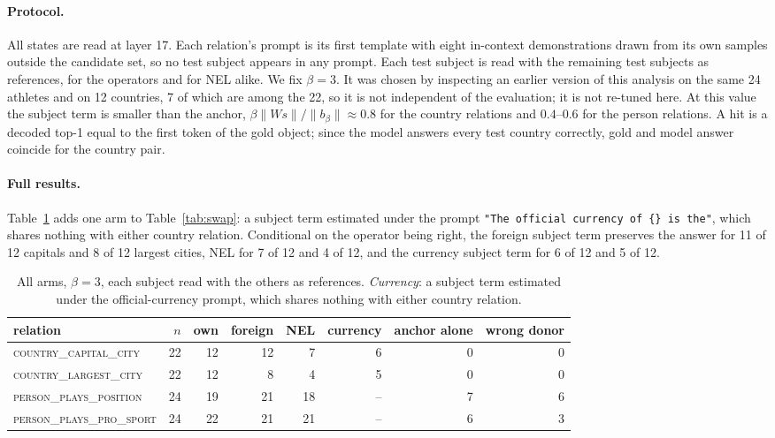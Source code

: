 \documentclass{article}
\begin{document}
\paragraph{Protocol.} All states are read at layer 17. Each relation's
prompt is its first template with eight in-context demonstrations drawn
from its own samples outside the candidate set, so no test subject
appears in any prompt. Each test subject is read with the remaining test
subjects as references, for the operators and for NEL alike. We fix
$\beta = 3$. It was chosen by inspecting an earlier version of this
analysis on the same 24 athletes and on 12 countries, 7 of which are
among the 22, so it is not independent of the evaluation; it is not
re-tuned here. At this value the subject term is
smaller than the anchor, $\beta\lVert W s\rVert / \lVert b_\beta\rVert
\approx 0.8$ for the country relations and $0.4$--$0.6$ for the person
relations. A hit is a decoded top-1 equal to the first token of the gold
object; since the model answers every test country correctly, gold and
model answer coincide for the country pair.


\paragraph{Full results.} Table~\ref{tab:swapfull} adds one arm to
Table~\ref{tab:swap}: a subject term estimated under the prompt
\texttt{"The official currency of \{\} is the"}, which shares nothing
with either country relation. Conditional on the operator being right,
the foreign subject term preserves the answer for 11 of 12 capitals and
8 of 12 largest cities, NEL for 7 of 12 and 4 of 12, and the currency
subject term for 6 of 12 and 5 of 12.

\begin{table}[h]
\centering
\small
\begin{tabular}{lrrrrrrr}
\toprule
relation & $n$ & own & foreign & NEL & currency & anchor alone & wrong donor \\
\midrule
\textsc{country\_capital\_city} & 22 & 12 & 12 & 7 & 6 & 0 & 0 \\
\textsc{country\_largest\_city} & 22 & 12 & 8 & 4 & 5 & 0 & 0 \\
\textsc{person\_plays\_position} & 24 & 19 & 21 & 18 & -- & 7 & 6 \\
\textsc{person\_plays\_pro\_sport} & 24 & 22 & 21 & 21 & -- & 6 & 3 \\
\bottomrule
\end{tabular}
\caption{All arms, $\beta = 3$, each subject read with the others as
references. \emph{Currency}: a subject term estimated under the
official-currency prompt, which shares nothing with either country
relation.}
\label{tab:swapfull}
\end{table}
\end{document}
